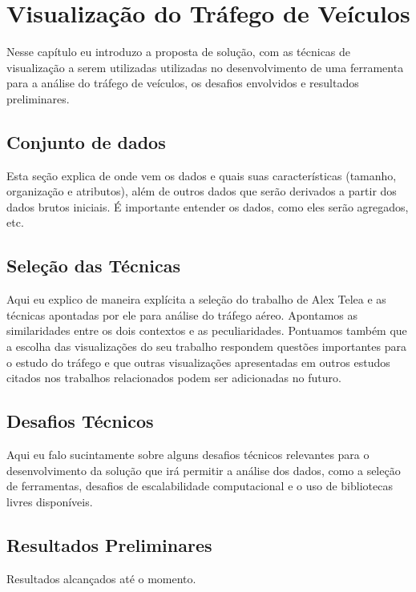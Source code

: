 \chapter{Visualização do Tráfego de Veículos}
\label{cap:visualizacao}

Nesse capítulo eu introduzo a proposta de solução, com as técnicas de
visualização a serem utilizadas utilizadas no desenvolvimento de uma ferramenta
para a análise do tráfego de veículos, os desafios envolvidos e resultados
preliminares.

\section{Conjunto de dados}

Esta seção explica de onde vem os dados e quais suas características (tamanho,
organização e atributos), além de outros dados que serão derivados a partir dos
dados brutos iniciais. É importante entender os dados, como eles serão
agregados, etc.

\section{Seleção das Técnicas}

Aqui eu explico de maneira explícita a seleção do trabalho de Alex Telea e as
técnicas apontadas por ele para análise do tráfego aéreo. Apontamos as
similaridades entre os dois contextos e as peculiaridades. Pontuamos também que
a escolha das visualizações do seu trabalho respondem questões importantes para
o estudo do tráfego e que outras visualizações apresentadas em outros estudos
citados nos trabalhos relacionados podem ser adicionadas no futuro.

\section{Desafios Técnicos}

Aqui eu falo sucintamente sobre alguns desafios técnicos relevantes para o
desenvolvimento da solução que irá permitir a análise dos dados, como a seleção
de ferramentas, desafios de escalabilidade computacional e o uso de bibliotecas
livres disponíveis.

\section{Resultados Preliminares}

Resultados alcançados até o momento.

